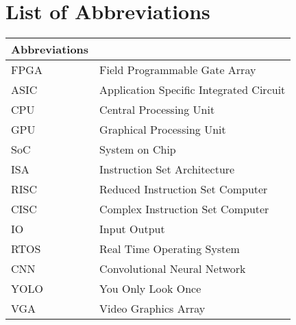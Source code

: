 


\clearpage
\pagestyle{headings}

\chapter[List of Abbreviations ]{List of Abbreviations}


\begin{center}
	\small
	\begin{longtable}{ll}
	\toprule
	Abbreviations & {} \\
	\bottomrule
	FPGA			& Field Programmable Gate Array \\
	ASIC			& Application Specific Integrated Circuit \\
	CPU				& Central Processing Unit \\
	GPU				& Graphical Processing Unit \\
	SoC				& System on Chip \\
	ISA				& Instruction Set Architecture \\
    RISC            & Reduced Instruction Set Computer \\
	CISC            & Complex Instruction Set Computer \\
	IO				& Input Output \\
	RTOS			& Real Time Operating System \\
	CNN			    & Convolutional Neural Network \\
    YOLO            & You Only Look Once \\
	VGA				& Video Graphics Array \\
	\hline 
	\end{longtable}
\end{center}

\clearpage

\tableofcontents
	\clearpage
\listoffigures
\listoftables


